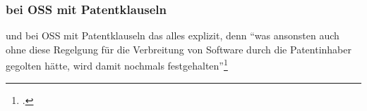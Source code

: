 \documentclass[DIV=calc,BCOR=5mm,11pt,headings=small,oneside,abstract=true, toc=bib]{scrartcl}
\begin{document}
\subsubsection{bei OSS mit Patentklauseln}
und bei OSS mit Patentklauseln das alles explizit, denn \enquote{was
ansonsten auch ohne diese Regelgung für die Verbreitung von Software
durch die Patentinhaber gegolten hätte, wird damit nochmals
festgehalten}\footcite[vgl.][128]{Suchomski2011a}

\small

\end{document}
